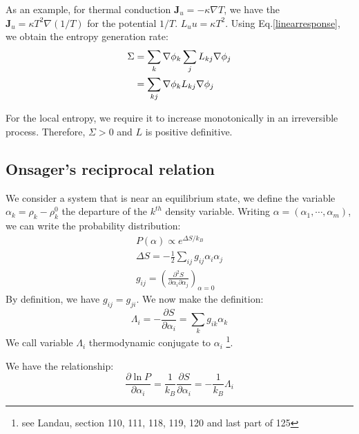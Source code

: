 \documentclass{article}
\newcommand{\pfrac}[2]{\frac{\partial #1}{\partial #2}}
\begin{document}
As an example, for thermal conduction $\mathbf{J}_u = - \kappa \nabla T$, we have 
the $\mathbf{J}_u = \kappa T^2 \nabla (1/T)$ for the potential $1/T$. $L_uu = \kappa T^2$.
Using Eq.\ref{linearresponse}, we obtain the entropy generation rate:
\begin{align}
    \Sigma &= \sum_k \nabla \phi_k \sum_j L_{kj} \nabla \phi_j \notag \\
        & = \sum_{kj} \nabla \phi_k L_{kj} \nabla \phi_j
\end{align}

For the local entropy, we require it to increase monotonically in an irreversible process. Therefore,
$\Sigma > 0$ and $L$ is positive definitive.

\subsection{Onsager's reciprocal relation}
We consider a system that is near an equilibrium state, we define the 
variable $\alpha_k = \rho_k - \rho_k^0$ the departure of the $k^{th}$ density
variable. Writing $\alpha = (\alpha_1, \cdots, \alpha_m)$, we can write 
the probability distribution:
\begin{gather}
    P(\alpha) \propto e^{\Delta S/k_B} \\
    \Delta S = -\frac{1}{2} \sum_{ij} g_{ij} \alpha_i \alpha_j \\
    g_{ij} = \left( \frac{\partial^2S}{\partial \alpha_i \partial \alpha_j} \right)_{\alpha=0}
\end{gather}
By definition, we have $g_{ij} = g_{ji}$. We now make the definition:
\begin{equation}
    \Lambda_i = - \pfrac{S}{\alpha_i} = \sum_k g_{ik} \alpha_k \label{conjugate_alpha}
\end{equation}
We call variable $\Lambda_i$ thermodynamic conjugate to $\alpha_i$
\footnote{see Landau, section 110, 111, 118, 119, 120 and last part of 125}. 

We have the relationship:
\begin{equation}
    \pfrac{\ln P}{\alpha_i} = \frac{1}{k_B} \frac{\partial S}{\partial \alpha_i} 
    = - \frac{1}{k_B} \Lambda_i \label{tmp}
\end{equation}
\end{document}
